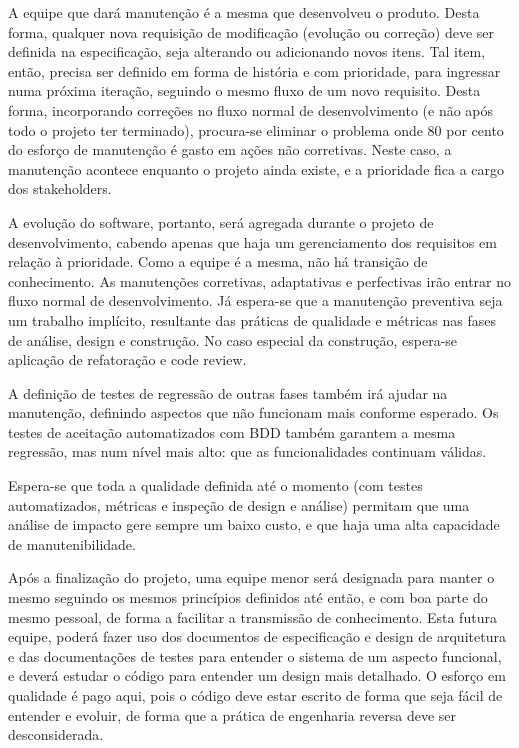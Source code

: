 \documentclass[12pt,journal,compsoc]{IEEEtran}
\begin{document}
A equipe que dará manutenção é a mesma que desenvolveu o produto. Desta forma, qualquer nova requisição de modificação (evolução ou correção) deve ser definida na especificação, seja alterando ou adicionando novos itens. Tal item, então, precisa ser definido em forma de história e com prioridade, para ingressar numa próxima iteração, seguindo o mesmo fluxo de um novo requisito. Desta forma, incorporando correções no fluxo normal de desenvolvimento (e não após todo o projeto ter terminado), procura-se eliminar o problema onde 80 por cento do esforço de manutenção é gasto em ações não corretivas. Neste caso, a manutenção acontece enquanto o projeto ainda existe, e a prioridade fica a cargo dos stakeholders. 

A evolução do software, portanto, será agregada durante o projeto de desenvolvimento, cabendo apenas que haja um gerenciamento dos requisitos em relação à prioridade. Como a equipe é a mesma, não há transição de conhecimento. As manutenções corretivas, adaptativas e perfectivas irão entrar no fluxo normal de desenvolvimento. Já espera-se que a manutenção preventiva seja um trabalho implícito, resultante das práticas de qualidade e métricas nas fases de análise, design e construção. No caso especial da construção, espera-se aplicação de refatoração e code review.

A definição de testes de regressão de outras fases também irá ajudar na manutenção, definindo aspectos que não funcionam mais conforme esperado. Os testes de aceitação automatizados com BDD também garantem a mesma regressão, mas num nível mais alto: que as funcionalidades continuam válidas. 

Espera-se que toda a qualidade definida até o momento (com testes automatizados, métricas e inspeção de design e análise) permitam que uma análise de impacto gere sempre um baixo custo, e que haja uma alta capacidade de manutenibilidade. 

Após a finalização do projeto, uma equipe menor será designada para manter o mesmo seguindo os mesmos princípios definidos até então, e com boa parte do mesmo pessoal, de forma a facilitar a transmissão de conhecimento. Esta futura equipe, poderá fazer uso dos documentos de especificação e design de arquitetura e das documentações de testes para entender o sistema de um aspecto funcional, e deverá estudar o código para entender um design mais detalhado. O esforço em qualidade é pago aqui, pois o código deve estar escrito de forma que seja fácil de entender e evoluir, de forma que a prática de engenharia reversa deve ser desconsiderada. 
\end{document}
